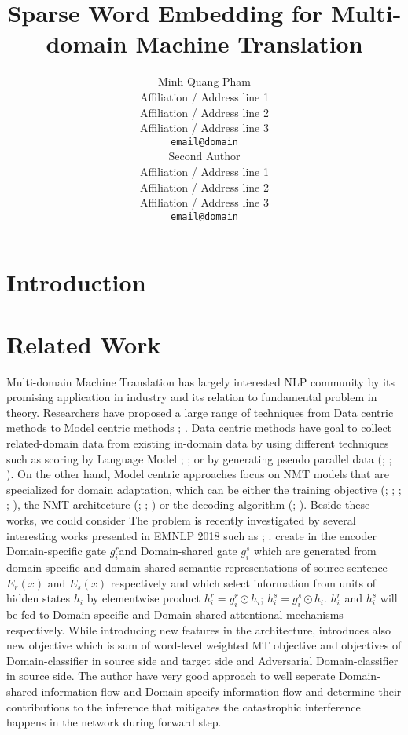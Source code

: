 \documentclass[11pt,a4paper]{article}
\title{Sparse Word Embedding for Multi-domain Machine Translation}
\author{Minh Quang Pham\\
  Affiliation / Address line 1 \\
  Affiliation / Address line 2 \\
  Affiliation / Address line 3 \\
  {\tt email@domain} \\\And
  Second Author \\
  Affiliation / Address line 1 \\
  Affiliation / Address line 2 \\
  Affiliation / Address line 3 \\
  {\tt email@domain} \\}
\date{}
\begin{document}
\maketitle
\begin{abstract}
\end{abstract}

\section{Introduction}

\section{Related Work}
Multi-domain Machine Translation has largely interested NLP community by its promising application in industry and its relation to fundamental problem in theory. Researchers have proposed a large range of techniques from Data centric methods to Model centric methods \cite{C18-1111}; \cite{P17-2061}. Data centric methods have goal to collect related-domain data from existing in-domain data by using different techniques such as scoring by Language Model \cite{P10-2041}; \cite{D11-1033}; \cite{P13-2119} or by generating pseudo parallel data (\cite{P03-1010}; \cite{C16-1295}; \cite{D14-1023}). On the other hand, Model centric approaches focus on NMT models that are specialized for domain adaptation, which can be either the training objective (\cite{Luong2015SNMT}; \cite{P16-1009}; \cite{D17-1155}; \cite{W17-3205}; \cite{D17-1156}), the NMT architecture (\cite{R17-1049}; \cite{gulcehre2016monolingual}; \cite{W17-4712}) or the decoding algorithm (\cite{gulcehre2016monolingual}; \cite{I17-2004}). Beside these works, we could consider  
The problem is recently investigated by several interesting works presented in EMNLP 2018 such as \cite{D18-1039}; \cite{D18-1041}. \cite{D18-1041} create in the encoder Domain-specific gate $g^r_i$and Domain-shared gate $g^s_i$ which are generated from domain-specific and domain-shared semantic representations of source sentence $E_r(x)$ and $E_s(x)$ respectively and which select information from units of hidden states $h_i$ by elementwise product $h^r_i = g^r_i \odot h_i$; $h^s_i = g^s_i \odot h_i$. $h^r_i$ and $h^s_i$ will be fed to Domain-specific and Domain-shared attentional mechanisms respectively. While introducing new features in the architecture, \cite{D18-1041} introduces also new objective which is sum of word-level weighted MT objective and objectives of Domain-classifier in source side and target side and Adversarial Domain-classifier in source side. The author have very good approach to well seperate Domain-shared information flow and Domain-specify information flow and determine their contributions to the inference that mitigates the catastrophic interference happens in the network during forward step. 
\end{document}
